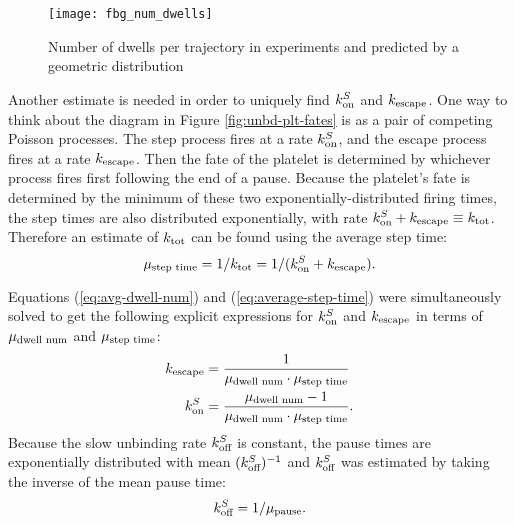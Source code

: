 \documentclass{biophys-new}
\newcommand{\tn}{\textnormal}
\newcommand{\inv}{^{-1}}
\begin{document}
\begin{figure}
  \centering
  \texttt{[image: fbg\_num\_dwells]}
  \caption[Fit to dwell counts per trajectory]{Number of dwells per
    trajectory in experiments and predicted by a geometric
    distribution}
  \label{fig:ndwells}
\end{figure}

Another estimate is needed in order to uniquely find $k^S_\textnormal{on}$ and
$k_\textnormal{escape}$. One way to think about the diagram in Figure
\ref{fig:unbd-plt-fates} is as a pair of competing Poisson
processes. The step process fires at a rate $k^S_\textnormal{on}$, and the
escape process fires at a rate $k_\textnormal{escape}$. Then the fate of the
platelet is determined by whichever process fires first following the
end of a pause. Because the platelet's fate is determined by the
minimum of these two exponentially-distributed firing times, the step
times are also distributed exponentially, with rate
$k^S_\textnormal{on} + k_\textnormal{escape} \equiv k_\textnormal{tot}$. Therefore an estimate of
$k_\textnormal{tot}$ can be found using the average step time:
\begin{equation}
  \mu_\tn{step time} = 1/\jvTot = 1/(\jvOnSlow + \jvEscape).
  \label{eq:average-step-time}
\end{equation}

Equations (\ref{eq:avg-dwell-num}) and (\ref{eq:average-step-time})
were simultaneously solved to get the following explicit expressions
for $k^S_\textnormal{on}$ and $k_\textnormal{escape}$ in terms of $\mu_\tn{dwell num}$ and
$\mu_\tn{step time}$:
\begin{align}
  \label{eq:escape-estimate}
  \jvEscape &= \frac{1}{\mu_\tn{dwell num} \cdot \mu_\tn{step time}}
  \\
  \label{eq:slow-on-estimate}
  \jvOnSlow &= \frac{\mu_\tn{dwell num} - 1}{\mu_\tn{dwell num} \cdot
              \mu_\tn{step time}}.
\end{align}
Because the slow unbinding rate $k^S_\textnormal{off}$ is constant, the pause
times are exponentially distributed with mean $(\jvOffSlow)\inv$ and
$k^S_\textnormal{off}$ was estimated by taking the inverse of the mean pause
time:
\begin{equation}
  \label{eq:slow-off-estimate}
  \jvOffSlow = 1/\mu_\tn{pause}.
\end{equation}

\end{document}
